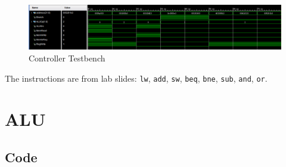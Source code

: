 \documentclass[a4paper,12pt]{article}
\begin{document}
\begin{figure}[H]
    \centering
    \includegraphics[width=\textwidth]{tb1.png}
    \caption{Controller Testbench}
\end{figure}

The instructions are from lab slides: \texttt{lw}, \texttt{add}, \texttt{sw}, \texttt{beq}, \texttt{bne}, \texttt{sub}, \texttt{and}, \texttt{or}.

\section*{ALU}

\subsection*{Code}
\end{document}
